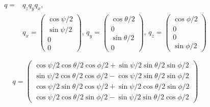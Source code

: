 \documentclass{article}
\begin{document}
\begin{displaymath}
\begin{split}
  q =& q_zq_yq_x, \\
  &q_x = \begin{pmatrix} \cos{\psi/2} \\
  \sin{\psi/2} \\ 0 \\ 0 \end{pmatrix}, \,
  q_y = \begin{pmatrix} \cos{\theta/2} \\
  0 \\ \sin{\theta/2} \\ 0 \end{pmatrix}, \,
  q_z = \begin{pmatrix} \cos{\phi/2} \\
  0 \\ 0 \\ \sin{\phi/2} \end{pmatrix}
\end{split}
\end{displaymath}

\begin{equation}
  q = \begin{pmatrix}
    \cos{\psi/2}\cos{\theta/2}\cos{\phi/2}+\sin{\psi/2}\sin{\theta/2}\sin{\phi/2} \\
    \sin{\psi/2}\cos{\theta/2}\cos{\phi/2}-\cos{\psi/2}\sin{\theta/2}\sin{\phi/2} \\
    \cos{\psi/2}\sin{\theta/2}\cos{\psi/2}+\sin{\psi/2}\cos{\theta/2}\sin{\phi/2} \\
    \cos{\psi/2}\cos{\theta/2}\sin{\phi/2}-\sin{\psi/2}\sin{\theta/2}\cos{\phi/2}
  \end{pmatrix}
\end{equation}
\end{document}
